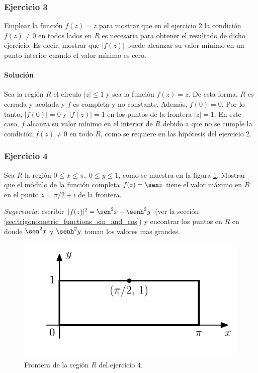 \documentclass[a4paper]{report}
\begin{document}
\subsubsection{Ejercicio 3}

Emplear la función \(f(z)=z\) para mostrar que en el ejercicio 2 la condición \(f(z)\neq0\) en todos lados en \(R\) es necesaria para obtener el resultado de dicho ejercicio. Es decir, mostrar que \(|f(z)|\) puede alcanzar su valor mínimo en un punto interior cuando el valor mínimo es cero. 

\paragraph{Solución} Sea la región \(R\) el círculo \(|z|\leq1\) y sea la función \(f(z)=z\). De esta forma, \(R\) es cerrada y acotada y \(f\) es completa y no constante. Además, \(f(0)=0\). Por lo tanto, \(|f(0)|=0\) y \(|f(z)|=1\) en los puntos de la frontera \(|z|=1\). En este caso, \(f\) alcanza su valor mínimo en el interior de \(R\) debido a que no se cumple la condición \(f(z)\neq0\) en todo \(R\), como se requiere en las hipótesis del ejercicio 2.

\subsubsection{Ejercicio 4}

Sea \(R\) la región \(0\leq x\leq\pi,\;0\leq y\leq1\), como se muestra en la figura \ref{fig:exercise_59_04_R}. Mostrar que el módulo de la función completa \(f(z)=\sen z\) tiene el valor máximo en \(R\) en el punto \(z=\pi/2+i\) de la frontera.

\emph{Sugerencia:} escribir \(|f(z)|^2=\sen^2x+\senh^2y\) (ver la sección \ref{sec:trigonometric_functions_sin_and_cos}) y encontrar los puntos en \(R\) en donde \(\sen^2x\) y \(\senh^2y\) toman los valores mas grandes.
\begin{figure}[!htb]
  \begin{minipage}[c]{0.42\textwidth}
    \includegraphics[width=\textwidth]{figuras/exercise_59_04_R.pdf}
  \end{minipage}\hfill
  \begin{minipage}[c]{0.48\textwidth}
    \caption{
       Frontera de la región \(R\) del ejercicio 4.
    }\label{fig:exercise_59_04_R}
  \end{minipage}
\end{figure}
\end{document}
